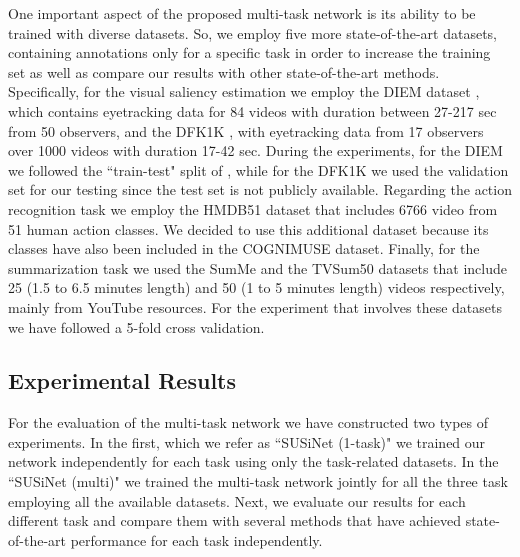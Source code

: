 \documentclass[10pt,twocolumn,letterpaper]{article}
\begin{document}
One important aspect of the proposed multi-task network is its ability to be trained with diverse datasets. So, we employ five more state-of-the-art datasets, containing annotations only for a specific task in order to increase the training set as well as compare our results with other state-of-the-art methods. Specifically, for the visual saliency estimation we employ the DIEM dataset \cite{mital2011clustering}, which contains eyetracking data for 84 videos with duration between 27-217 sec from 50 observers, and the DFK1K \cite{wang2018revisiting}, with eyetracking data from 17 observers over 1000 videos with duration 17-42 sec. During the experiments, for the DIEM we followed the ``train-test" split of \cite{BSI13}, while for the DFK1K we used the validation set for our testing since the test set is not publicly available. Regarding the action recognition task we employ the HMDB51 dataset \cite{kuehne2011hmdb} that includes 6766 video from 51 human action classes. We decided to use this additional dataset because its classes have also been included in the \mbox{COGNIMUSE} dataset. Finally, for the summarization task we used the SumMe \cite{gygli2014creating} and the TVSum50 \cite{song2015tvsum} datasets that include 25 (1.5 to 6.5 minutes length) and 50 (1 to 5 minutes length) videos respectively, mainly from YouTube resources. For the experiment that involves these datasets we have followed a 5-fold cross validation.   

\subsection{Experimental Results}

For the evaluation of the multi-task network we have constructed two types of experiments. In the first, which we refer as ``SUSiNet (1-task)" we trained our network independently for each task using only the task-related datasets. In the ``SUSiNet (multi)" we trained the multi-task network jointly for all the three task employing all the available datasets. Next, we evaluate our results for each different task and compare them with several methods that have achieved state-of-the-art performance for each task independently.  
\end{document}

